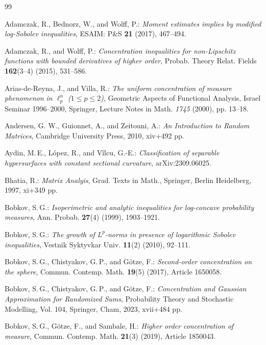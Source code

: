 \documentclass[a4paper,12pt]{amsart}
\numberwithin{equation}{section}
\theoremstyle{remark}
\begin{document}
\begin{thebibliography}{99}

 Adamczak, R., Bednorz, W., and Wolff, P.: \emph{Moment estimates implies by modified log-Sobolev inequalities}, ESAIM: P\&S \textbf{21} (2017), 467--494.

 Adamczak, R., and Wolff, P.: \emph{Concentration inequalities for non-Lipschitz functions with bounded derivatives of higher order}, Probab. Theory Relat. Fields \textbf{162}(3--4) (2015), 531--586.

 Arias-de-Reyna, J., and Villa, R.: \emph{The uniform concentration of measure phenomenon in $\ell_p^n$ ($1\le p\le2$)}, Geometric Aspects of Functional Analysis, Israel Seminar 1996--2000, Springer, Lecture Notes in Math. \emph{1745} (2000), pp. 13--18.

 Andersen, G. W., Guionnet, A., and Zeitouni, A.: \emph{An Introduction to Random Matrices},  Cambridge University Press, 2010, xiv+492 pp.

 Aydin, M.\,E., L\'{o}pez, R., and V\^{i}lcu, G.-E.: \emph{Classification of separable hypersurfaces with constant sectional curvature}, arXiv:2309.06025.

 Bhatia, R.: \emph{Matrix Analyis}, Grad. Texts in Math., Springer, Berlin Heidelberg, 1997, xi+349 pp.

 Bobkov, S.\,G.: \emph{Isoperimetric and analytic inequalities for log-concave probability measures}, Ann. Probab. \textbf{27}(4) (1999), 1903--1921.

 Bobkov, S.\,G.: \emph{The growth of $L^p$-norms in presence of logarithmic Sobolev inequalities}, Vestnik Syktyvkar Univ. \textbf{11}(2) (2010), 92--111.

 Bobkov, S.\,G., Chistyakov, G.\,P., and G\"{o}tze, F.: \emph{Second-order concentration on the sphere}, Commun. Contemp. Math. \textbf{19}(5) (2017), Article 1650058.

 Bobkov, S.\,G., Chistyakov, G.\,P., and G\"{o}tze, F.: \emph{Concentration and Gaussian Approximation for Randomized Sums}, Probability Theory and Stochastic Modelling, Vol. 104, Springer, Cham, 2023, xvii+484 pp.

 Bobkov, S.\,G., G\"{o}tze, F., and Sambale, H.: \emph{Higher order concentration of measure}, Commun. Contemp. Math. \textbf{21}(3) (2019), Article 1850043.


\end{thebibliography}
\end{document}
